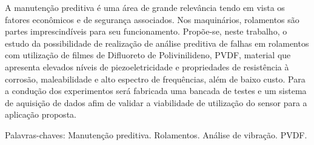 \documentclass[
	12pt,				
	oneside,			
	a4paper,			
	english,			
	brazil				
	]{abntex2ppgsi}
\begin{document}
\frenchspacing 



\imprimircapa

\imprimirfolhaderosto




\setlength{\absparsep}{18pt} %
\begin{resumo}



A manutenção preditiva é uma área de grande relevância tendo em vista os fatores econômicos e de segurança associados. Nos maquinários, rolamentos são partes imprescindíveis para seu funcionamento. Propõe-se, neste trabalho, o estudo da possibilidade de realização de análise preditiva de falhas em rolamentos com utilização de filmes de Difluoreto de Polivinilideno, PVDF, material que apresenta elevados níveis de piezoeletricidade e propriedades de resistência à corrosão, maleabilidade e alto espectro de frequências, além de baixo custo. Para a condução dos experimentos será fabricada uma bancada de testes e um sistema de aquisição de dados afim de validar a viabilidade de utilização do sensor para a aplicação proposta.

Palavras-chaves: Manutenção preditiva. Rolamentos. Análise de vibração. PVDF.
\end{resumo}

\end{document}
